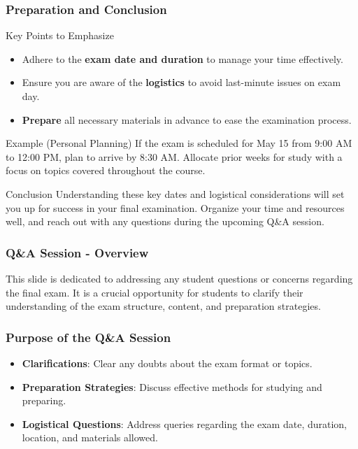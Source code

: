 \documentclass[aspectratio=169]{beamer}
\begin{document}
\begin{frame}[fragile]
    \frametitle{Preparation and Conclusion}
    \begin{block}{Key Points to Emphasize}
        \begin{itemize}
            \item Adhere to the \textbf{exam date and duration} to manage your time effectively.
            \item Ensure you are aware of the \textbf{logistics} to avoid last-minute issues on exam day.
            \item \textbf{Prepare} all necessary materials in advance to ease the examination process.
        \end{itemize}
    \end{block}
    
    \begin{block}{Example (Personal Planning)}
        If the exam is scheduled for May 15 from 9:00 AM to 12:00 PM, plan to arrive by 8:30 AM. Allocate prior weeks for study with a focus on topics covered throughout the course.
    \end{block}

    \begin{block}{Conclusion}
        Understanding these key dates and logistical considerations will set you up for success in your final examination. Organize your time and resources well, and reach out with any questions during the upcoming Q\&A session.
    \end{block}
\end{frame}

\begin{frame}[fragile]
    \frametitle{Q\&A Session - Overview}
    This slide is dedicated to addressing any student questions or concerns regarding the final exam. 
    It is a crucial opportunity for students to clarify their understanding of the exam structure, content, and preparation strategies.
\end{frame}

\begin{frame}[fragile]
    \frametitle{Purpose of the Q\&A Session}
    \begin{itemize}
        \item \textbf{Clarifications}: Clear any doubts about the exam format or topics.
        \item \textbf{Preparation Strategies}: Discuss effective methods for studying and preparing.
        \item \textbf{Logistical Questions}: Address queries regarding the exam date, duration, location, and materials allowed.
    \end{itemize}
\end{frame}
\end{document}
